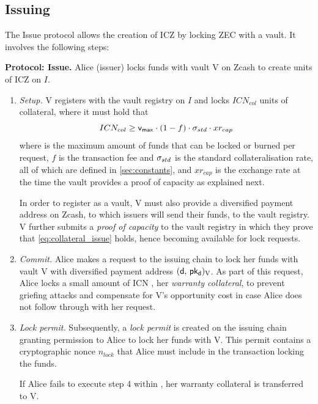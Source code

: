 \subsection{Issuing}
\label{sec:issuing_hl}

The Issue protocol allows the creation of ICZ by locking ZEC with a vault.
It involves the following steps:

\textbf{Protocol: Issue.} Alice (issuer) locks funds with vault V on Zcash to create units of ICZ on $I$.
\begin{enumerate}
    \item \emph{Setup.} V registers with the vault registry on $I$ and locks  $ICN_{col}$ units of collateral, where it must hold that
    \begin{equation}\label{eq:collateral_issue}
        ICN_{col} \geq \mathsf{v_{max}} \cdot (1 - f) \cdot \sigma_{std} \cdot xr_{cap}
    \end{equation}
    where \vmax is the maximum amount of funds that can be locked or burned per request, $f$ is the \zclaim transaction fee and $\sigma_{std}$ is the standard collateralisation rate, all of which are defined in \cref{sec:constants}, and $xr_{cap}$ is the exchange rate at the time the vault provides a proof of capacity as explained next.
    
    In order to register as a vault, V must also provide a diversified payment address on Zcash, to which issuers will send their funds, to the vault registry.
    V further submits a \emph{proof of capacity} to the vault registry in which they prove that \cref{eq:collateral_issue} holds, hence becoming available for lock requests.
    
    \item \emph{Commit.} Alice makes a request to the issuing chain to lock her funds with vault V with diversified payment address $(\mathsf{d},\, \mathsf{pk_d})_\text{V}$.
    As part of this request, Alice locks a small amount of ICN \iw, her \emph{warranty collateral}, to prevent griefing attacks and compensate for V's opportunity cost in case Alice does not follow through with her request.
    
    \item \emph{Lock permit.} Subsequently, a \emph{lock permit} is created on the issuing chain granting permission to Alice to lock her funds with V.
    This permit contains a cryptographic nonce $n_{lock}$ that Alice must include in the transaction locking the funds.

    If Alice fails to execute step 4 within \dm, her warranty collateral \iw is transferred to V.
    

\end{enumerate}
